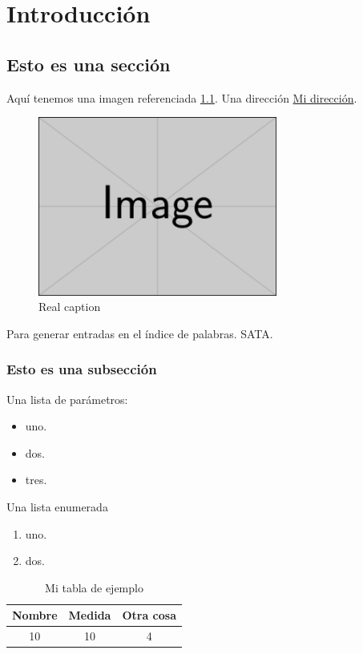 \chapter[Introducción]{Introducción}
\label{Chap1}

\section{Esto es una sección}
Aquí tenemos una imagen referenciada \ref{fig:ej9999}. Una dirección \href{https://www.copernicus.eu/es}{Mi dirección}\footnotemark. 
			\begin{figure} [h!]
			\centering
			\includegraphics[width=0.7\textwidth]{fig/example-image.png}
			\caption[Nombre reducido para tabla de figuras]{Real caption}
			\label{fig:ej9999}
		\end{figure}

Para generar entradas en el índice de palabras. SATA.

\subsection{Esto es una subsección}
Una lista de parámetros: %
	\begin{itemize}
		\item uno.
		\item dos.
		\item tres.
	\end{itemize}
	Una lista enumerada
	\begin{enumerate}
		\item  uno.
		\item  dos.
	\end{enumerate}
\begin{table}[H]\caption{Mi tabla de ejemplo}\label{tab:ej}
\begin{center}
	\begin{tabular}{c c c}
		Nombre & Medida & Otra cosa\\
		\hline
		10 & 10 & 4\\
	\end{tabular}
\end{center}
\end{table}